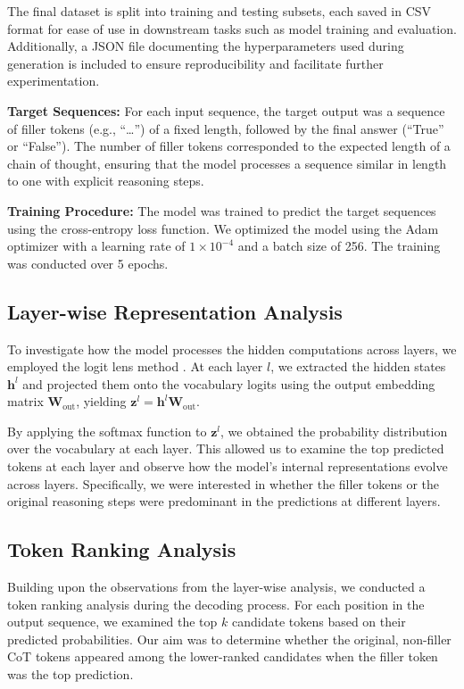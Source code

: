 \documentclass{article}
\begin{document}
The final dataset is split into training and testing subsets, each saved in CSV format for ease of use in downstream tasks such as model training and evaluation. Additionally, a JSON file documenting the hyperparameters used during generation is included to ensure reproducibility and facilitate further experimentation.

\textbf{Target Sequences:} For each input sequence, the target output was a sequence of filler tokens (e.g., ``\ldots'') of a fixed length, followed by the final answer (``True'' or ``False''). The number of filler tokens corresponded to the expected length of a chain of thought, ensuring that the model processes a sequence similar in length to one with explicit reasoning steps.

\textbf{Training Procedure:} The model was trained to predict the target sequences using the cross-entropy loss function. We optimized the model using the Adam optimizer with a learning rate of $1 \times 10^{-4}$ and a batch size of 256. The training was conducted over 5 epochs.

\subsection{Layer-wise Representation Analysis}

To investigate how the model processes the hidden computations across layers, we employed the logit lens method \cite{nostalgebraist2020}. At each layer $l$, we extracted the hidden states $\mathbf{h}^l$ and projected them onto the vocabulary logits using the output embedding matrix $\mathbf{W}_{\text{out}}$, yielding $\mathbf{z}^l = \mathbf{h}^l \mathbf{W}_{\text{out}}$.

By applying the softmax function to $\mathbf{z}^l$, we obtained the probability distribution over the vocabulary at each layer. This allowed us to examine the top predicted tokens at each layer and observe how the model's internal representations evolve across layers. Specifically, we were interested in whether the filler tokens or the original reasoning steps were predominant in the predictions at different layers.

\subsection{Token Ranking Analysis}

Building upon the observations from the layer-wise analysis, we conducted a token ranking analysis during the decoding process. For each position in the output sequence, we examined the top $k$ candidate tokens based on their predicted probabilities. Our aim was to determine whether the original, non-filler CoT tokens appeared among the lower-ranked candidates when the filler token was the top prediction.
\end{document}
